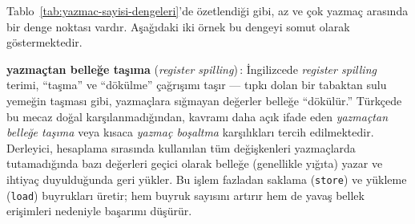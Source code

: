 Tablo~\ref{tab:yazmac-sayisi-dengeleri}'de özetlendiği gibi, az ve çok yazmaç arasında bir denge noktası vardır. Aşağıdaki iki örnek bu dengeyi somut olarak göstermektedir.

\begin{terimnotu}
\textbf{yazmaçtan belleğe taşıma} (\emph{register spilling})\,: İngilizcede \emph{register spilling} terimi, ``taşma'' ve ``dökülme'' çağrışımı taşır --- tıpkı dolan bir tabaktan sulu yemeğin taşması gibi, yazmaçlara sığmayan değerler belleğe ``dökülür.'' Türkçede bu mecaz doğal karşılanmadığından, kavramı daha açık ifade eden \emph{yazmaçtan belleğe taşıma} veya kısaca \emph{yazmaç boşaltma} karşılıkları tercih edilmektedir. Derleyici, hesaplama sırasında kullanılan tüm değişkenleri yazmaçlarda tutamadığında bazı değerleri geçici olarak belleğe (genellikle yığıta) yazar ve ihtiyaç duyulduğunda geri yükler. Bu işlem fazladan saklama (\texttt{store}) ve yükleme (\texttt{load}) buyrukları üretir; hem buyruk sayısını artırır hem de yavaş bellek erişimleri nedeniyle başarımı düşürür.
\end{terimnotu}

